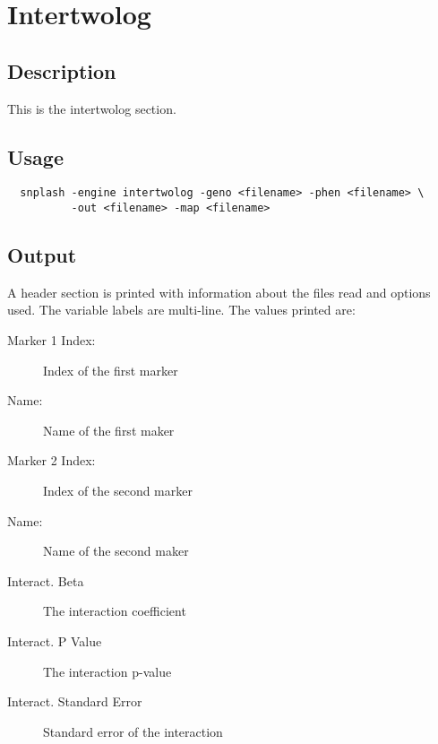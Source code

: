 \section{Intertwolog}
\label{sec:i2l}
\subsection{Description}
This is the intertwolog section.

\subsection{Usage}

\begin{verbatim}
  snplash -engine intertwolog -geno <filename> -phen <filename> \
          -out <filename> -map <filename>
\end{verbatim}

\subsection{Output}
A header section is printed with information about the files read and options
used.  The variable labels are multi-line.  The values printed are:

\begin{description}
\item[Marker 1 Index:] Index of the first marker
\item[Name:] Name of the first maker
\item[Marker 2 Index:] Index of the second marker
\item[Name:] Name of the second maker
\item[Interact. Beta] The interaction coefficient
\item[Interact. P Value] The interaction p-value
\item[Interact. Standard Error] Standard error of the interaction
\end{description}